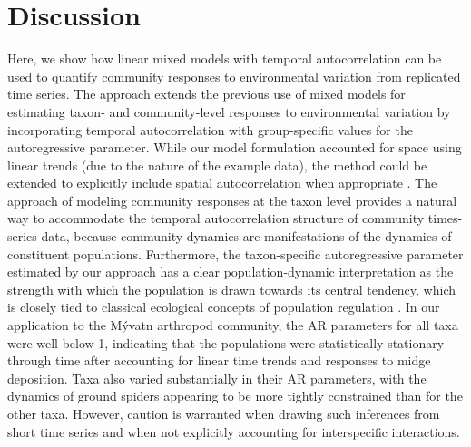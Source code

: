 
\section*{Discussion}

Here, we show how linear mixed models with temporal autocorrelation can be used to quantify
community responses to environmental variation from replicated time series. 
The approach extends the previous use of mixed models for estimating taxon- and community-level
responses to environmental variation \citep{Jackson2012, Bartrons2015} by
incorporating temporal autocorrelation with group-specific values for the autoregressive parameter. 
While our model formulation accounted for space using linear trends (due to the nature of the example data),
the method could be extended to explicitly include spatial autocorrelation when appropriate
\citep[similar to][]{Bartrons2015}.
The approach of modeling community responses at the taxon level
provides a natural way to accommodate the temporal autocorrelation
structure of community times-series data,
because community dynamics are manifestations of the dynamics of constituent populations.
Furthermore, the taxon-specific autoregressive parameter
estimated by our approach has a clear population-dynamic interpretation as the
strength with which the population is drawn towards its central tendency, 
which is closely tied to classical ecological
concepts of population regulation \citep{Nicholson1933, Ziebarth2010}. 
In our application to the M\'{y}vatn arthropod community,
the AR parameters for all taxa were well below 1,
indicating that the populations were statistically stationary through time 
after accounting for linear time trends and responses to midge deposition.
Taxa also varied substantially in their AR parameters,
with the dynamics of ground spiders appearing to be more tightly constrained than for the other taxa.
However, caution is warranted when drawing such inferences from short time series
and when not explicitly accounting for interspecific interactions.



